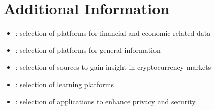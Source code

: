 \chapter{Additional Information}
\label{app:A}

\begin{itemize}
\setlength\itemsep{0em}
    \item {}:    selection of platforms for financial and economic related data   
  
    \item {}:   selection of platforms for general information
  
    \item {}: selection of sources to gain insight in cryptocurrency markets
    \item {}:   selection of learning platforms
    \item {}: selection of applications to enhance privacy and security
\end{itemize}

\clearpage




